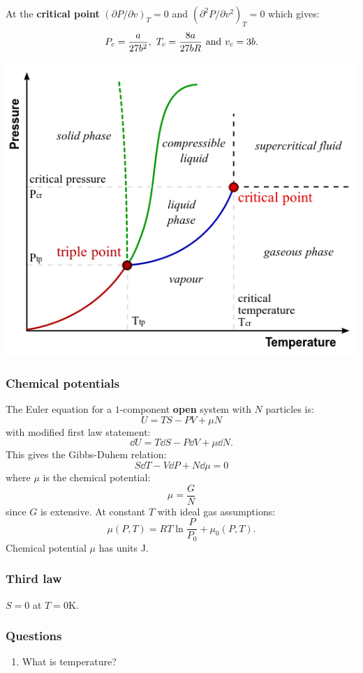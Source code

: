 \documentclass{article}
\begin{document}
\begin{multicols*}{3}
At the \textbf{critical point} $(\partial P/\partial v)_T=0$
and $(\partial^2 P/\partial v^2)_T=0$
which gives:
$$P_c=\frac{a}{27b^2},\hspace{0.05in}
T_c=\frac{8a}{27bR}
\hspace{0.05in}\text{and}\hspace{0.05in}
v_c=3b.$$
\begin{center}
    \includegraphics*[scale=0.25]{f1.png}
\end{center}

\newcolumn

\subsubsection*{Chemical potentials}
The Euler equation for a $1$-component
\textbf{open} system with
$N$ particles is:
$$U=TS-PV+\mu N$$
with modified first law statement: 
$$\dd U
=T\dd S-P\dd V+\mu\dd N.$$
This gives the Gibbs-Duhem relation:
$$S\dd T-V\dd P+N\dd\mu=0$$
where $\mu$ is the chemical potential:
$$\mu=\frac{G}{N}$$
since $G$ is extensive. At constant $T$
with ideal gas assumptions:
$$\mu(P,T)=RT\ln\frac{P}{P_0}+\mu_0(P,T).$$
Chemical potential $\mu$ has units J.

\subsubsection*{Third law}
$S=0$ at $T=0$K.

\subsubsection*{Questions}
\begin{enumerate}
    \item What is temperature?
\end{enumerate}

\end{multicols*}
\end{document}
